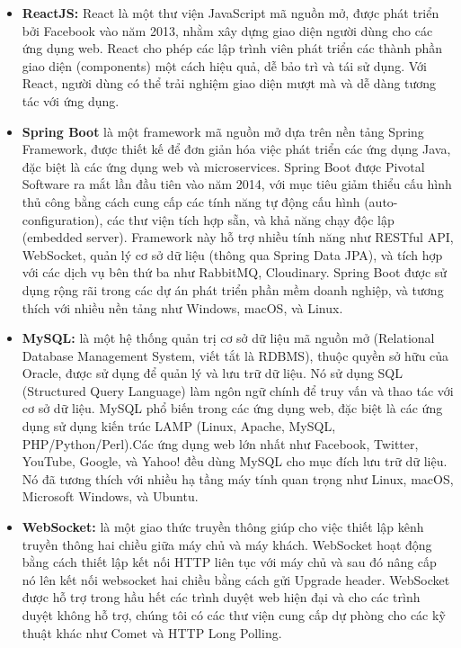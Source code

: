\begin{itemize}
    \item \textbf{ReactJS:} React là một thư viện JavaScript mã nguồn mở, được phát triển bởi Facebook vào năm 2013, nhằm xây dựng giao diện người dùng cho các ứng dụng web. React cho phép các lập trình viên phát triển các thành phần giao diện (components) một cách hiệu quả, dễ bảo trì và tái sử dụng. Với React, người dùng có thể trải nghiệm giao diện mượt mà và dễ dàng tương tác với ứng dụng.
\end{itemize}

\begin{itemize}
    \item \textbf{Spring Boot} là một framework mã nguồn mở dựa trên nền tảng Spring Framework, được thiết kế để đơn giản hóa việc phát triển các ứng dụng Java, đặc biệt là các ứng dụng web và microservices. Spring Boot được Pivotal Software ra mắt lần đầu tiên vào năm 2014, với mục tiêu giảm thiểu cấu hình thủ công bằng cách cung cấp các tính năng tự động cấu hình (auto-configuration), các thư viện tích hợp sẵn, và khả năng chạy độc lập (embedded server). Framework này hỗ trợ nhiều tính năng như RESTful API, WebSocket, quản lý cơ sở dữ liệu (thông qua Spring Data JPA), và tích hợp với các dịch vụ bên thứ ba như RabbitMQ, Cloudinary. Spring Boot được sử dụng rộng rãi trong các dự án phát triển phần mềm doanh nghiệp, và tương thích với nhiều nền tảng như Windows, macOS, và Linux.
\end{itemize}

\begin{itemize}
    \item \textbf{MySQL:} là một hệ thống quản trị cơ sở dữ liệu mã nguồn mở (Relational Database Management System, viết tắt là RDBMS), thuộc quyền sở hữu của Oracle, được sử dụng để quản lý và lưu trữ dữ liệu. Nó sử dụng SQL (Structured Query Language) làm ngôn ngữ chính để truy vấn và thao tác với cơ sở dữ liệu. MySQL phổ biến trong các ứng dụng web, đặc biệt là các ứng dụng sử dụng kiến trúc LAMP (Linux, Apache, MySQL, PHP/Python/Perl).Các ứng dụng web lớn nhất như Facebook, Twitter, YouTube, Google, và Yahoo! đều dùng MySQL cho mục đích lưu trữ dữ liệu. Nó đã tương thích với nhiều hạ tầng máy tính quan trọng như Linux, macOS, Microsoft Windows, và Ubuntu.
\end{itemize}

\begin{itemize}
    \item \textbf{WebSocket:} là một giao thức truyền thông giúp cho việc thiết lập kênh truyền thông hai chiều giữa máy chủ và máy khách. WebSocket hoạt động bằng cách thiết lập kết nối HTTP liên tục với máy chủ và sau đó nâng cấp nó lên kết nối websocket hai chiều bằng cách gửi Upgrade header. WebSocket được hỗ trợ trong hầu hết các trình duyệt web hiện đại và cho các trình duyệt không hỗ trợ, chúng tôi có các thư viện cung cấp dự phòng cho các kỹ thuật khác như Comet và HTTP Long Polling.
\end{itemize}

